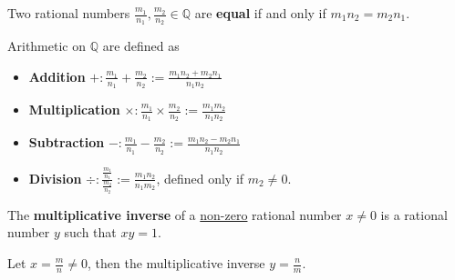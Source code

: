 \documentclass[10pt]{article}
\begin{document}
	\begin{definition}
		Two rational numbers $\frac{m_1}{n_1}, \frac{m_2}{n_2} \in \mathbb{Q}$ are \textbf{equal} if and only if  $m_1 n_2 = m_2 n_1$.
	\end{definition}
	
	\begin{definition}
		Arithmetic on $\mathbb{Q}$ are defined as 
		\begin{itemize}
			\item \textbf{Addition} $+: \frac{m_1}{n_1} + \frac{m_2}{n_2} := \frac{m_1 n_2 + m_2 n_1}{n_1 n_2}$
			\item \textbf{Multiplication} $\times: \frac{m_1}{n_1} \times \frac{m_2}{n_2} := \frac{m_1 m_2}{n_1 n_2}$
			\item \textbf{Subtraction} $-: \frac{m_1}{n_1} - \frac{m_2}{n_2} := \frac{m_1 n_2 - m_2 n_1}{n_1 n_2}$
			\item \textbf{Division} $\div: \frac{\frac{m_1}{n_1}}{\frac{m_2}{n_2}} := \frac{m_1 n_2}{n_1 m_2}$, defined only if $m_2 \neq 0$.
		\end{itemize}
	\end{definition}
	
	\begin{definition}
		The \textbf{multiplicative inverse} of a \ul{non-zero} rational number $x \neq 0$ is a rational number $y$ such that $xy=1$.
	\end{definition}
	\begin{remark}
		Let $x = \frac{m}{n} \neq 0$, then the multiplicative inverse $y = \frac{n}{m}$.
	\end{remark}
	
\end{document}

